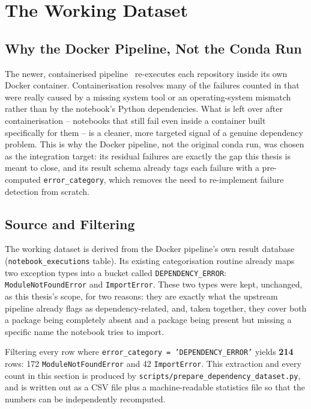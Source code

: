 \section{The Working Dataset}
\label{sec:pd-i1}

\subsection{Why the Docker Pipeline, Not the Conda Run}
\label{sec:pd-why-docker}

The newer, containerised pipeline~\cite{samuel2025docker} re-executes each
repository inside its own Docker container. Containerisation resolves many
of the failures counted in  that were really caused by a
missing system tool or an operating-system mismatch rather than by the
notebook's Python dependencies. What is left over after containerisation --
notebooks that still fail even inside a container built specifically for
them -- is a cleaner, more targeted signal of a genuine dependency problem.
This is why the Docker pipeline, not the original conda run, was chosen as
the integration target: its residual failures are exactly the gap this
thesis is meant to close, and its result schema already tags each failure
with a pre-computed \texttt{error\_category}, which removes the need to
re-implement failure detection from scratch.

\subsection{Source and Filtering}
\label{sec:pd-source}

The working dataset is derived from the Docker pipeline's own result
database (\texttt{notebook\_executions} table). Its existing categorisation
routine already maps two exception types into a bucket called
\texttt{DEPENDENCY\_ERROR}: \texttt{ModuleNotFoundError} and
\texttt{ImportError}. These two types were kept, unchanged, as this thesis's
scope, for two reasons: they are exactly what the upstream pipeline already
flags as dependency-related, and, taken together, they cover both a package
being completely absent and a package being present but missing a specific
name the notebook tries to import.

Filtering every row where \texttt{error\_category = 'DEPENDENCY\_ERROR'}
yields \textbf{214} rows: 172 \texttt{ModuleNotFoundError} and 42
\texttt{ImportError}. This extraction and every count in this section is
produced by \texttt{scripts/prepare\_dependency\_dataset.py}, and is written
out as a CSV file plus a machine-readable statistics file so that the
numbers can be independently recomputed.

